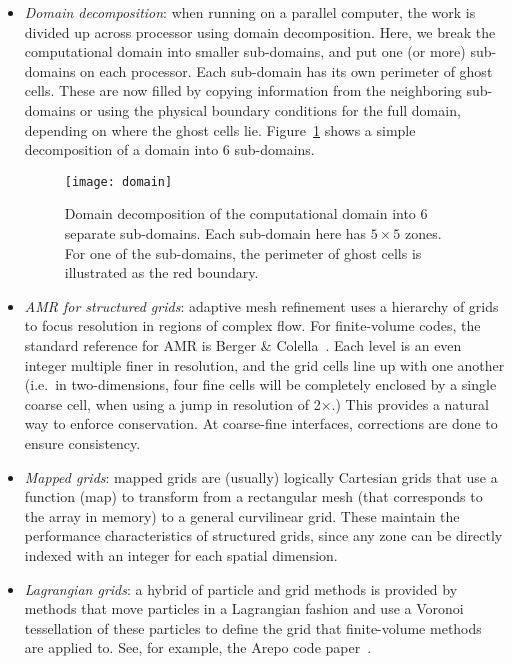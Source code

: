\begin{itemize}

\item {\em Domain decomposition}: when running on a parallel computer,
 the work is divided up across processor using domain decomposition.
 Here, we break the computational domain into smaller sub-domains, and
 put one (or more) sub-domains on each processor.  Each sub-domain
 has its own perimeter of ghost cells.  These are now filled by copying
 information from the neighboring sub-domains or using the physical
 boundary conditions for the full domain, depending on where the
 ghost cells lie.  Figure~\ref{fig:domain} shows a simple decomposition of
 a domain into 6 sub-domains.

 \begin{figure}
 \centering
 \texttt{[image: domain]}
 \caption[Domain decomposition example] {\label{fig:domain} Domain
   decomposition of the computational domain into 6 separate
   sub-domains.  Each sub-domain here has $5\times 5$ zones.  For one
   of the sub-domains, the perimeter of ghost cells is illustrated as
   the red boundary.}
 \end{figure}

\item {\em AMR for structured grids}: adaptive mesh refinement uses a
  hierarchy of grids to focus resolution in regions of complex flow.
  For finite-volume codes, the standard reference for AMR is Berger \&
  Colella~\cite{berger-colella}.  Each level is an even integer
  multiple finer in resolution, and the grid cells line up with one
  another (i.e.\ in two-dimensions, four fine cells will be completely
  enclosed by a single coarse cell, when using a jump in resolution of
  2$\times$.)  This provides a natural way to enforce conservation.
  At coarse-fine interfaces, corrections are done to ensure
  consistency.

\item {\em Mapped grids}: mapped grids are (usually) logically
  Cartesian grids that use a function (map) to transform from
  a rectangular mesh (that corresponds to the array in memory)
  to a general curvilinear grid.  These maintain the performance
  characteristics of structured grids, since any zone can be
  directly indexed with an integer for each spatial dimension. 

\item {\em Lagrangian grids}: a hybrid of particle and grid methods is
  provided by methods that move particles in a Lagrangian fashion and
  use a Voronoi tessellation of these particles to define the grid
  that finite-volume methods are applied to.  See, for example,
  the Arepo code paper~\cite{arepo}.
\end{itemize}
